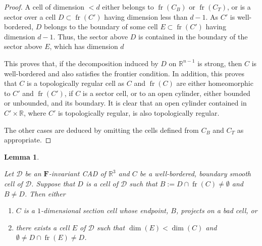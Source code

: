 \documentclass[
]{book}
\providecommand{\tightlist}{%
  \setlength{\itemsep}{0pt}\setlength{\parskip}{0pt}}
\newtheorem{lemma}{Lemma}[chapter]
\theoremstyle{definition}
\theoremstyle{definition}
\theoremstyle{definition}
\theoremstyle{definition}
\theoremstyle{remark}
\begin{document}
\begin{proof}
A cell of dimension \(< d\) either belongs to \({\operatorname{fr} \left( C_B \right)}\) or \({\operatorname{fr} \left( C_T \right)}\), or is a sector over a cell \(D \subset {\operatorname{fr} \left( C' \right)}\) having dimension less than \(d-1\).
As \(C'\) is well-bordered, \(D\) belongs to the boundary of some cell \(E \subset {\operatorname{fr} \left( C' \right)}\) having dimension \(d-1\).
Thus, the sector above \(D\) is contained in the boundary of the sector above \(E\), which has dimension \(d\)

This proves that, if the decomposition induced by \(D\) on \(\mathbb{R}^{n-1}\) is strong, then \(C\) is well-bordered and also satisfies the frontier condition. In addition, this proves that \(C\) is a topologically regular cell as \(C\) and \({\operatorname{fr} \left( C \right)}\) are either homeomorphic to \(C'\) and \({\operatorname{fr} \left( C' \right)}\), if \(C\) is a sector cell, or to an open cylinder, either bounded or unbounded, and its boundary. It is clear that an open cylinder contained in \(C' \times \mathbb{R}\), where \(C'\) is topologically regular, is also topologically regular.

The other cases are deduced by omitting the cells defined from \(C_B\) and \(C_T\) as appropriate.
\end{proof}

\begin{lemma}
\protect\hypertarget{lem:lazard-5-13}{}\label{lem:lazard-5-13}

\citep[ Proposition 5.13]{lazard10}
Let \(\mathcal{D}\) be an \(\mathbf{F}\)-invariant CAD of \(\mathbb{R}^3\) and \(C\) be a well-bordered, boundary smooth cell of \(\mathcal{D}\).
Suppose that \(D\) is a cell of \(\mathcal{D}\) such that \(B := D \cap {\operatorname{fr} \left(  C  \right)} \neq \emptyset\) and \(B \neq D\). Then either

\begin{enumerate}
\def\labelenumi{\arabic{enumi}.}
\tightlist
\item
  \(C\) is a \(1\)-dimensional section cell whose endpoint, \(B\), projects on a bad cell, or
\item
  there exists a cell \(E\) of \(\mathcal{D}\) such that \(\dim(E) < \dim(C)\) and \(\emptyset \neq D \cap {\operatorname{fr} \left(  E  \right)} \neq D\).
\end{enumerate}

\end{lemma}
\end{document}
